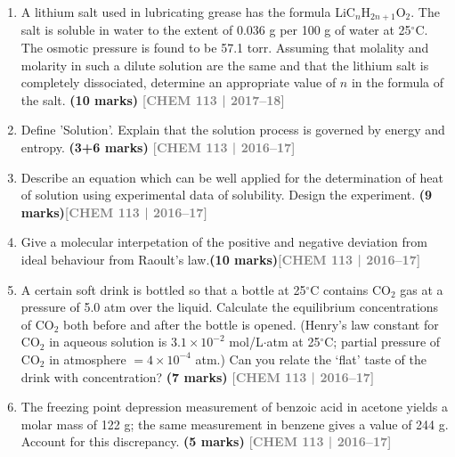 \documentclass[12pt,a3paper]{article}
\newcommand{\yr}[1]{\hfill\textcolor{gray}{\small\textbf{[#1]}}}
\newcommand{\mk}[1]{\textcolor{orange!70!black}{\small\textbf{(#1 marks)}}}
\begin{document}
\begin{enumerate}
\item A lithium salt used in lubricating grease has the formula LiC$_n$H$_{2n+1}$O$_2$. The salt is soluble in water to the extent of 0.036 g per 100 g of water at 25$^\circ$C. The osmotic pressure is found to be 57.1 torr. Assuming that molality and molarity in such a dilute solution are the same and that the lithium salt is completely dissociated, determine an appropriate value of $n$ in the formula of the salt. \mk{10}
\yr{CHEM 113 | 2017--18}



\item Define 'Solution'. Explain that the solution process is governed by energy and entropy. \mk{3+6}
\yr{CHEM 113 | 2016--17}  




\item Describe an equation which can be well applied for the determination of heat of solution using experimental data of solubility. Design the experiment. \mk{9}\yr{CHEM 113 | 2016--17}




\item Give a molecular interpetation of the positive and negative deviation from ideal behaviour from Raoult's law.\mk{10}\yr{CHEM 113 | 2016--17}




\item A certain soft drink is bottled so that a bottle at 25$^\circ$C contains CO$_2$ gas at a pressure of 5.0 atm over the liquid. Calculate the equilibrium concentrations of CO$_2$ both before and after the bottle is opened. (Henry's law constant for CO$_2$ in aqueous solution is $3.1 \times 10^{-2}$ mol/L$\cdot$atm at 25$^\circ$C; partial pressure of CO$_2$ in atmosphere $= 4 \times 10^{-4}$ atm.) Can you relate the `flat' taste of the drink with concentration? \mk{7}
\yr{CHEM 113 | 2016--17}



\item The freezing point depression measurement of benzoic acid in acetone yields a molar mass of 122 g; the same measurement in benzene gives a value of 244 g. Account for this discrepancy. \mk{5}
\yr{CHEM 113 | 2016--17}




\end{enumerate}
\end{document}
